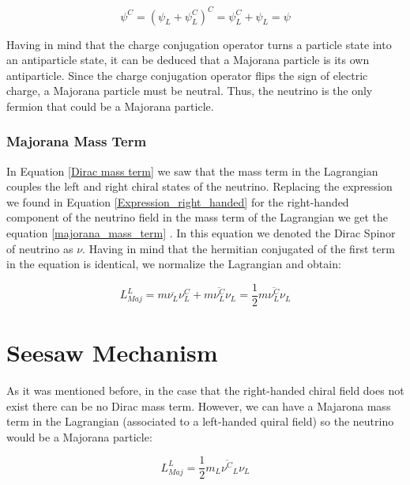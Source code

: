 \begin{equation}
\psi^C = (\psi_L + \psi^C_L)^C = \psi^C_L + \psi_L = \psi
\end{equation}

Having in mind that the charge conjugation operator turns a particle state into an antiparticle state, it can be deduced that a Majorana particle is its own antiparticle.
Since the charge conjugation operator flips the sign of electric charge, a Majorana particle must be neutral. Thus, the neutrino is the only fermion that could be a Majorana particle.

\subsubsection{Majorana Mass Term}

In Equation \ref{Dirac mass term} we saw that the mass term in the Lagrangian couples the left and right chiral states of the neutrino. Replacing the 
expression we found in Equation \ref{Expression_right_handed} for the right-handed component of the neutrino field in the mass term of the Lagrangian we get the equation \ref{majorana_mass_term} \cite{Theory_neutrinos_book}. In this equation we denoted the Dirac Spinor of neutrino as $\nu$. Having in mind that the hermitian conjugated of the first term in the equation is identical, we normalize the Lagrangian and obtain:


\begin{equation}\label{majorana_mass_term}
L_{Maj}^{L} = m \overline{\nu_L} \nu_L^C + m \overline{\nu_L^C} \nu_L = \frac{1}{2} m \overline{\nu_L^{C}} \nu_L
\end{equation}


\section{Seesaw Mechanism}

As it was mentioned before, in the case that the right-handed chiral field does not exist there can be no Dirac mass term. However, we can have a Majarona mass term in the 
Lagrangian (associated to a left-handed quiral field) so the neutrino would be a Majorana particle:

\begin{equation}
L_{Maj}^{L} = \frac{1}{2} m_L \overline{\nu^{C}}_L \nu_L
\end{equation}

